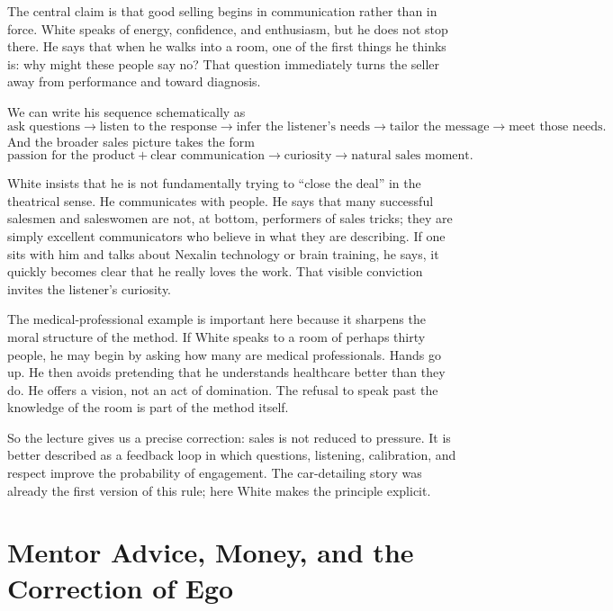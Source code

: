 The central claim is that good selling begins in communication rather than in force. White speaks of energy, confidence, and enthusiasm, but he does not stop there. He says that when he walks into a room, one of the first things he thinks is: why might these people say no? That question immediately turns the seller away from performance and toward diagnosis.

We can write his sequence schematically as
\begin{equation}
\text{ask questions}
\to
\text{listen to the response}
\to
\text{infer the listener's needs}
\to
\text{tailor the message}
\to
\text{meet those needs}.
\end{equation}
And the broader sales picture takes the form
\begin{equation}
\text{passion for the product}+\text{clear communication}
\to
\text{curiosity}
\to
\text{natural sales moment}.
\end{equation}

White insists that he is not fundamentally trying to ``close the deal'' in the theatrical sense. He communicates with people. He says that many successful salesmen and saleswomen are not, at bottom, performers of sales tricks; they are simply excellent communicators who believe in what they are describing. If one sits with him and talks about Nexalin technology or brain training, he says, it quickly becomes clear that he really loves the work. That visible conviction invites the listener's curiosity.

The medical-professional example is important here because it sharpens the moral structure of the method. If White speaks to a room of perhaps thirty people, he may begin by asking how many are medical professionals. Hands go up. He then avoids pretending that he understands healthcare better than they do. He offers a vision, not an act of domination. The refusal to speak past the knowledge of the room is part of the method itself.

So the lecture gives us a precise correction: sales is not reduced to pressure. It is better described as a feedback loop in which questions, listening, calibration, and respect improve the probability of engagement. The car-detailing story was already the first version of this rule; here White makes the principle explicit.

\section{Mentor Advice, Money, and the Correction of Ego}

